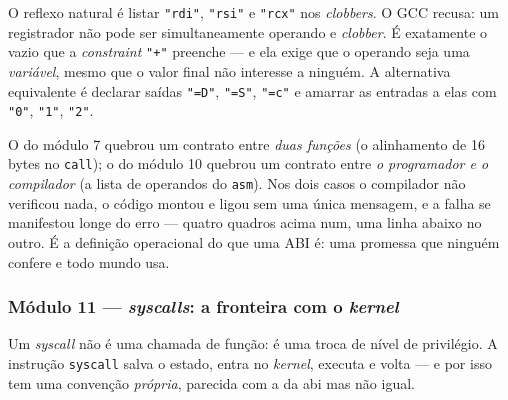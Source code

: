 \begin{armadilha}
O reflexo natural é listar \texttt{"rdi"}, \texttt{"rsi"} e \texttt{"rcx"} nos
\emph{clobbers}. O GCC recusa: um registrador não pode ser simultaneamente
operando e \emph{clobber}. É exatamente o vazio que a \emph{constraint}
\texttt{"+"} preenche --- e ela exige que o operando seja uma \emph{variável},
mesmo que o valor final não interesse a ninguém. A alternativa equivalente é
declarar saídas \texttt{"=D"}, \texttt{"=S"}, \texttt{"=c"} e amarrar as
entradas a elas com \texttt{"0"}, \texttt{"1"}, \texttt{"2"}.
\end{armadilha}

\begin{regra}
O do módulo 7 quebrou um contrato entre \emph{duas funções} (o alinhamento de
16 bytes no \texttt{call}); o do módulo 10 quebrou um contrato entre
\emph{o programador e o compilador} (a lista de operandos do \texttt{asm}). Nos
dois casos o compilador não verificou nada, o código montou e ligou sem uma
única mensagem, e a falha se manifestou longe do erro --- quatro quadros acima
num, uma linha abaixo no outro. É a definição operacional do que uma ABI é: uma
promessa que ninguém confere e todo mundo usa.
\end{regra}

\subsubsection{Módulo 11 --- \emph{syscalls}: a fronteira com o \emph{kernel}}

Um \emph{syscall} não é uma chamada de função: é uma troca de nível de
privilégio. A instrução \texttt{syscall} salva o estado, entra no
\emph{kernel}, executa e volta --- e por isso tem uma convenção \emph{própria},
parecida com a da \gls{abi} mas não igual.

